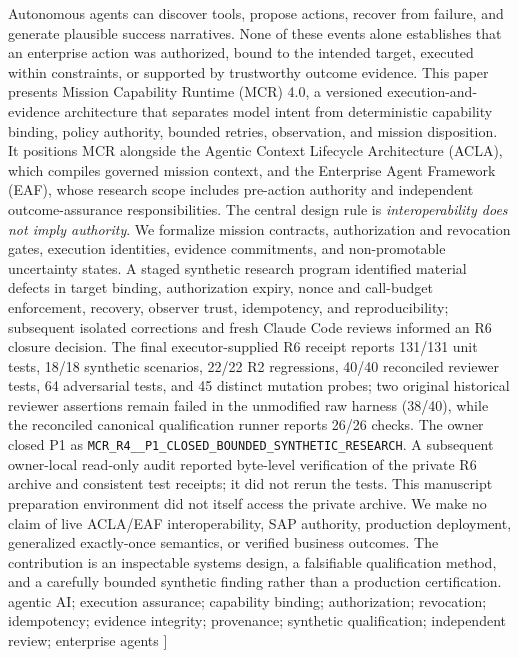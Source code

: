 \documentclass[11pt,twocolumn]{article}
\newcommand{\code}[1]{\texttt{#1}}
\begin{document}
{Autonomous agents can discover tools, propose actions, recover from failure, and generate plausible success narratives. None of these events alone establishes that an enterprise action was authorized, bound to the intended target, executed within constraints, or supported by trustworthy outcome evidence. This paper presents Mission Capability Runtime (MCR) 4.0, a versioned execution-and-evidence architecture that separates model intent from deterministic capability binding, policy authority, bounded retries, observation, and mission disposition. It positions MCR alongside the Agentic Context Lifecycle Architecture (ACLA), which compiles governed mission context, and the Enterprise Agent Framework (EAF), whose research scope includes pre-action authority and independent outcome-assurance responsibilities. The central design rule is \emph{interoperability does not imply authority}. We formalize mission contracts, authorization and revocation gates, execution identities, evidence commitments, and non-promotable uncertainty states. A staged synthetic research program identified material defects in target binding, authorization expiry, nonce and call-budget enforcement, recovery, observer trust, idempotency, and reproducibility; subsequent isolated corrections and fresh Claude Code reviews informed an R6 closure decision. The final executor-supplied R6 receipt reports 131/131 unit tests, 18/18 synthetic scenarios, 22/22 R2 regressions, 40/40 reconciled reviewer tests, 64 adversarial tests, and 45 distinct mutation probes; two original historical reviewer assertions remain failed in the unmodified raw harness (38/40), while the reconciled canonical qualification runner reports 26/26 checks. The owner closed P1 as \code{MCR\_\allowbreak R4\_\_\allowbreak P1\_\allowbreak CLOSED\_\allowbreak BOUNDED\_\allowbreak SYNTHETIC\_\allowbreak RESEARCH}. A subsequent owner-local read-only audit reported byte-level verification of the private R6 archive and consistent test receipts; it did not rerun the tests. This manuscript preparation environment did not itself access the private archive. We make no claim of live ACLA/EAF interoperability, SAP authority, production deployment, generalized exactly-once semantics, or verified business outcomes. The contribution is an inspectable systems design, a falsifiable qualification method, and a carefully bounded synthetic finding rather than a production certification.
\vspace{6pt}
 agentic AI; execution assurance; capability binding; authorization; revocation; idempotency; evidence integrity; provenance; synthetic qualification; independent review; enterprise agents
\vspace{10pt}
}]
\end{document}
